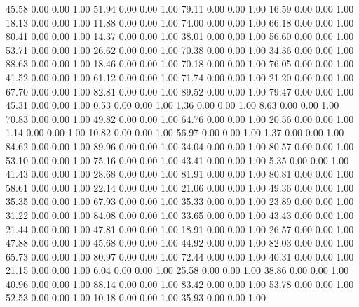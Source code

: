    45.58   0.00   0.00   1.00
   51.94   0.00   0.00   1.00
   79.11   0.00   0.00   1.00
   16.59   0.00   0.00   1.00
   18.13   0.00   0.00   1.00
   11.88   0.00   0.00   1.00
   74.00   0.00   0.00   1.00
   66.18   0.00   0.00   1.00
   80.41   0.00   0.00   1.00
   14.37   0.00   0.00   1.00
   38.01   0.00   0.00   1.00
   56.60   0.00   0.00   1.00
   53.71   0.00   0.00   1.00
   26.62   0.00   0.00   1.00
   70.38   0.00   0.00   1.00
   34.36   0.00   0.00   1.00
   88.63   0.00   0.00   1.00
   18.46   0.00   0.00   1.00
   70.18   0.00   0.00   1.00
   76.05   0.00   0.00   1.00
   41.52   0.00   0.00   1.00
   61.12   0.00   0.00   1.00
   71.74   0.00   0.00   1.00
   21.20   0.00   0.00   1.00
   67.70   0.00   0.00   1.00
   82.81   0.00   0.00   1.00
   89.52   0.00   0.00   1.00
   79.47   0.00   0.00   1.00
   45.31   0.00   0.00   1.00
    0.53   0.00   0.00   1.00
    1.36   0.00   0.00   1.00
    8.63   0.00   0.00   1.00
   70.83   0.00   0.00   1.00
   49.82   0.00   0.00   1.00
   64.76   0.00   0.00   1.00
   20.56   0.00   0.00   1.00
    1.14   0.00   0.00   1.00
   10.82   0.00   0.00   1.00
   56.97   0.00   0.00   1.00
    1.37   0.00   0.00   1.00
   84.62   0.00   0.00   1.00
   89.96   0.00   0.00   1.00
   34.04   0.00   0.00   1.00
   80.57   0.00   0.00   1.00
   53.10   0.00   0.00   1.00
   75.16   0.00   0.00   1.00
   43.41   0.00   0.00   1.00
    5.35   0.00   0.00   1.00
   41.43   0.00   0.00   1.00
   28.68   0.00   0.00   1.00
   81.91   0.00   0.00   1.00
   80.81   0.00   0.00   1.00
   58.61   0.00   0.00   1.00
   22.14   0.00   0.00   1.00
   21.06   0.00   0.00   1.00
   49.36   0.00   0.00   1.00
   35.35   0.00   0.00   1.00
   67.93   0.00   0.00   1.00
   35.33   0.00   0.00   1.00
   23.89   0.00   0.00   1.00
   31.22   0.00   0.00   1.00
   84.08   0.00   0.00   1.00
   33.65   0.00   0.00   1.00
   43.43   0.00   0.00   1.00
   21.44   0.00   0.00   1.00
   47.81   0.00   0.00   1.00
   18.91   0.00   0.00   1.00
   26.57   0.00   0.00   1.00
   47.88   0.00   0.00   1.00
   45.68   0.00   0.00   1.00
   44.92   0.00   0.00   1.00
   82.03   0.00   0.00   1.00
   65.73   0.00   0.00   1.00
   80.97   0.00   0.00   1.00
   72.44   0.00   0.00   1.00
   40.31   0.00   0.00   1.00
   21.15   0.00   0.00   1.00
    6.04   0.00   0.00   1.00
   25.58   0.00   0.00   1.00
   38.86   0.00   0.00   1.00
   40.96   0.00   0.00   1.00
   88.14   0.00   0.00   1.00
   83.42   0.00   0.00   1.00
   53.78   0.00   0.00   1.00
   52.53   0.00   0.00   1.00
   10.18   0.00   0.00   1.00
   35.93   0.00   0.00   1.00
